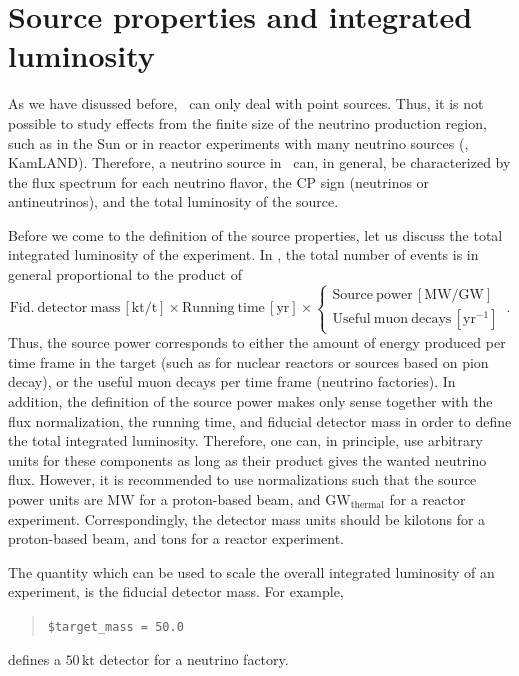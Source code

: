 \section{Source properties and integrated luminosity}
\label{sec:source}

As we have disussed before, \GLOBES\ can only deal with point sources. Thus,  it is not possible to study effects from the finite size of the neutrino production region, such as in the Sun or in reactor experiments with many
neutrino sources (\eg, KamLAND). Therefore, a neutrino source in \GLOBES\ can, in general, be characterized by the flux spectrum for each neutrino flavor, the CP sign (neutrinos or antineutrinos), and the total luminosity
of the source.

Before we come to the definition of the source properties, let us discuss
the total integrated luminosity of the experiment. In \GLOBES , the total number of events is in general proportional to the product of
\begin{equation}
\mathrm{Fid.~detector~mass}\,\left[\mathrm{kt/t}\right]\times 
\mathrm{Running~time} \,\left[\mathrm{yr}\right]\times\left\{ \begin{array}{c}
\mathrm{Source~power}\,\left[\mathrm{MW/GW}\right]\\
\mathrm{Useful~muon~decays}\,\left[\mathrm{yr}^{-1}\right]
\end{array}\right.\,.
\end{equation}
Thus, the source power corresponds to either the amount of energy produced per time frame in the target (such as for nuclear reactors or sources based on pion decay), or the useful muon decays per time frame (neutrino factories). In addition, the definition of the source power makes only sense together with the flux normalization, the running time, and fiducial detector mass in order to define the total integrated luminosity. Therefore, one can, in principle, use arbitrary units for these components as long as their product gives the wanted neutrino flux. However, it is
recommended to use normalizations such that the source power units are $\mathrm{MW}$ for a proton-based beam, and $\mathrm{GW}_\mathrm{thermal}$ for a reactor experiment. Correspondingly, the detector mass units should be kilotons for a proton-based beam, and tons for a reactor experiment.

The quantity which can be used to scale the overall integrated luminosity of an experiment, is the fiducial detector mass. For example,
\begin{quote}
{\tt \$target\_mass = 50.0 }
\end{quote}
defines a $50 \, \mathrm{kt}$ detector for a neutrino factory.

